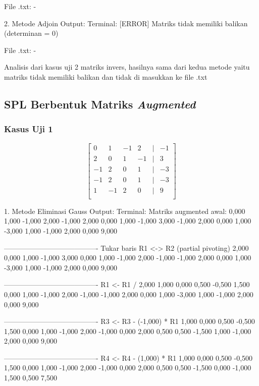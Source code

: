 \documentclass[12pt]{article}
\begin{document}
\begin{enumerate}
\begin{keluaran}
File .txt:
-

2. Metode Adjoin
Output:
Terminal:
[ERROR] Matriks tidak memiliki balikan (determinan = 0)

File .txt:
-
\end{keluaran}
Analisis dari kasus uji 2 matriks invers, hasilnya sama dari kedua metode yaitu matriks tidak memiliki balikan dan tidak di masukkan ke file .txt

\subsection{SPL Berbentuk Matriks \textit{Augmented}}
\subsubsection{Kasus Uji 1}
\begin{equation}
    \begin{bmatrix}
        0 & 1 & -1 & 2 & \mid & -1 \\
        2 & 0 & 1 & -1 & \mid & 3 \\
        -1 & 2 & 0 & 1 & \mid & -3 \\
        -1 & 2 & 0 & 1 & \mid & -3 \\
        1 & -1 & 2 & 0 & \mid & 9 \\
    \end{bmatrix}
\end{equation}
\begin{keluaran}
1. Metode Eliminasi Gauss
Output:
Terminal:
Matriks augmented awal:
0,000   1,000   -1,000  2,000   -1,000
2,000   0,000   1,000   -1,000  3,000
-1,000  2,000   0,000   1,000   -3,000
1,000   -1,000  2,000   0,000   9,000

----------------------------------------
Tukar baris R1 <-> R2 (partial pivoting)
2,000   0,000   1,000   -1,000  3,000
0,000   1,000   -1,000  2,000   -1,000
-1,000  2,000   0,000   1,000   -3,000
1,000   -1,000  2,000   0,000   9,000

----------------------------------------
R1 <- R1 / 2,000
1,000   0,000   0,500   -0,500  1,500
0,000   1,000   -1,000  2,000   -1,000
-1,000  2,000   0,000   1,000   -3,000
1,000   -1,000  2,000   0,000   9,000

----------------------------------------
R3 <- R3 - (-1,000) * R1
1,000   0,000   0,500   -0,500  1,500
0,000   1,000   -1,000  2,000   -1,000
0,000   2,000   0,500   0,500   -1,500
1,000   -1,000  2,000   0,000   9,000

----------------------------------------
R4 <- R4 - (1,000) * R1
1,000   0,000   0,500   -0,500  1,500
0,000   1,000   -1,000  2,000   -1,000
0,000   2,000   0,500   0,500   -1,500
0,000   -1,000  1,500   0,500   7,500


\end{keluaran}
\end{enumerate}
\end{document}

